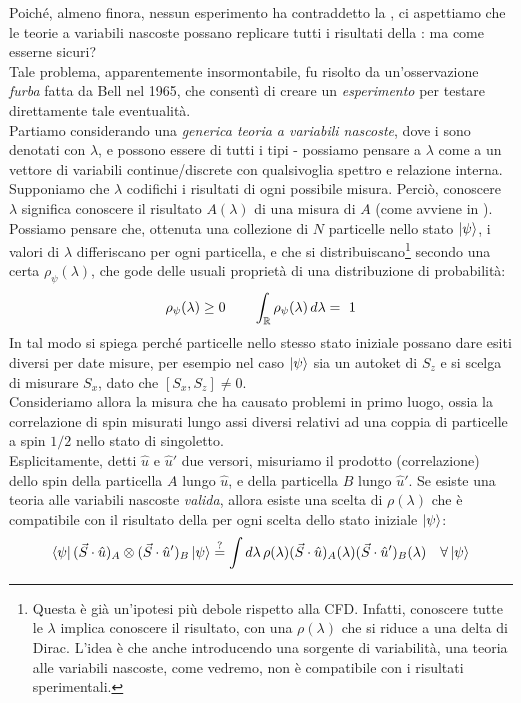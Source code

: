 \documentclass[../../FisicaTeorica.tex]{subfiles}
\begin{document}
Poiché, almeno finora, nessun esperimento ha contraddetto la \MQ, ci aspettiamo che le teorie a variabili nascoste possano replicare tutti i risultati della \MQ: ma come esserne sicuri?\\
Tale problema, apparentemente insormontabile, fu risolto da un'osservazione \textit{furba} fatta da Bell nel 1965, che consentì di creare un \textit{esperimento} per testare direttamente tale eventualità.\\

Partiamo considerando una \textit{generica teoria a variabili nascoste}, dove i  sono denotati con $\lambda$, e possono essere di tutti i tipi - possiamo pensare a $\lambda$ come a un vettore di variabili continue/discrete con qualsivoglia spettro e relazione interna. Supponiamo che $\lambda$ codifichi i risultati di ogni possibile misura. Perciò, conoscere $\lambda$ significa conoscere il risultato $A(\lambda)$ di una misura di $A$ (come avviene in \MC).\\
Possiamo pensare che, ottenuta una collezione di $N$ particelle nello stato $\Ket{\psi}$, i valori di $\lambda$ differiscano per ogni particella, e che si distribuiscano\footnote{Questa è già un'ipotesi più debole rispetto alla CFD. Infatti, conoscere tutte le $\lambda$ implica conoscere il risultato, con una $\rho(\lambda)$ che si riduce a una delta di Dirac. L'idea è che anche introducendo una sorgente di variabilità, una teoria alle variabili nascoste, come vedremo, non è compatibile con i risultati sperimentali.} secondo una certa $\rho_\psi(\lambda)$, che gode delle usuali proprietà di una distribuzione di probabilità:
\begin{align}
\rho_\psi(\lambda) \geq 0 \qquad \int_{\mathbb{R}} \rho_\psi(\lambda)\,d\lambda =\ 1
\label{eqn:distr_prob}
\end{align}
In tal modo si spiega perché particelle nello stesso stato iniziale possano dare esiti diversi per date misure, per esempio nel caso $\Ket{\psi}$ sia un autoket di $S_z$ e si scelga di misurare $S_x$, dato che $[S_x, S_z]\neq 0$.\\

Consideriamo allora la misura che ha causato problemi in primo luogo, ossia la correlazione di spin misurati lungo assi diversi relativi ad una coppia di particelle a spin $1/2$ nello stato di singoletto.\\
Esplicitamente, detti $\hat{u}$ e $\hat{u}'$ due versori, misuriamo il prodotto (correlazione) dello spin della particella $A$ lungo $\hat{u}$, e della particella $B$ lungo $\hat{u}'$. Se esiste una teoria alle variabili nascoste \textit{valida}, allora esiste una scelta di $\rho(\lambda)$ che è compatibile con il risultato della \MQ per ogni scelta dello stato iniziale $\Ket{\psi}$:
\begin{align*}
\Bra{\psi}(\vec{S}\cdot \hat{u})_A \otimes (\vec{S}\cdot \hat{u}')_B \Ket{\psi} \overset{?}{=} \int d\lambda\, \rho(\lambda) (\vec{S}\cdot \hat{u})_A(\lambda)(\vec{S}\cdot \hat{u}')_B(\lambda) \quad \forall \Ket{\psi}
\end{align*}
\end{document}

